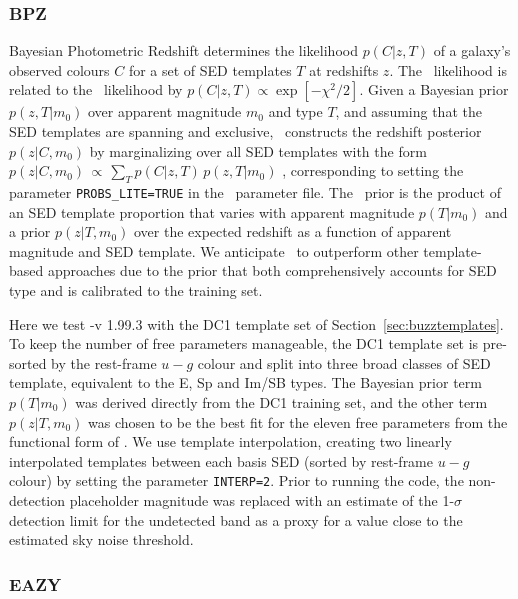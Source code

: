 \subsubsection{BPZ}
\label{sec:BPZ}

Bayesian Photometric Redshift \citep[\bpz,][]{Benitez:00} determines the likelihood $p(C \vert z, T)$ of a galaxy's observed colours $C$ for a set of SED templates $T$ at redshifts $z$.
The \bpz\ likelihood is related to the \chisq\ likelihood by $p(C \vert z, T) \propto \exp[- \chi^{2} / 2]$.
Given a Bayesian prior $p(z, T \vert m_{0})$ over apparent magnitude $m_0$ and type $T$, and assuming that the SED templates are spanning and exclusive, \bpz\ constructs the redshift posterior $p(z \vert C, m_0)$ by marginalizing over all SED templates with the form $p(z|C,m_0)\,\propto\, \sum_{T}p(C|z,T)\,p(z,T|m_0)$ \citep[Eq.~3 from][]{Benitez:00}, corresponding to setting the parameter \texttt{PROBS\_LITE=TRUE} in the \bpz\ parameter file.
The \bpz\ prior is the product of an SED template proportion that varies with apparent magnitude $p(T \vert m_{0})$ and a prior $p(z \vert T, m_{0})$ over the expected redshift as a function of apparent magnitude and SED template.
We anticipate \bpz\ to outperform other template-based approaches due to the prior that both comprehensively accounts for SED type and is calibrated to the training set.

Here we test \bpz-v 1.99.3 \citep{Benitez:00} with the DC1 template set of Section~\ref{sec:buzztemplates}.
To keep the number of free parameters manageable, the DC1 template set is pre-sorted by the rest-frame $u-g$ colour and split into three broad classes of SED template, equivalent to the E, Sp and Im/SB types.
The Bayesian prior term $p(T \vert m_{0})$ was derived directly from the DC1 training set, and the other term $p(z \vert T, m_{0})$ was chosen to be the best fit for the eleven free parameters from the functional form of \citet{Benitez:00}.
We use template interpolation, creating two linearly interpolated templates between each basis SED (sorted by rest-frame $u-g$ colour) by setting the parameter \texttt{INTERP=2}.
Prior to running the code, the non-detection placeholder magnitude was replaced with an estimate of the 1-$\sigma$ detection limit for the undetected band as a proxy for a value close to the estimated sky noise threshold.

\subsubsection{EAZY}
\label{sec:eazy}

